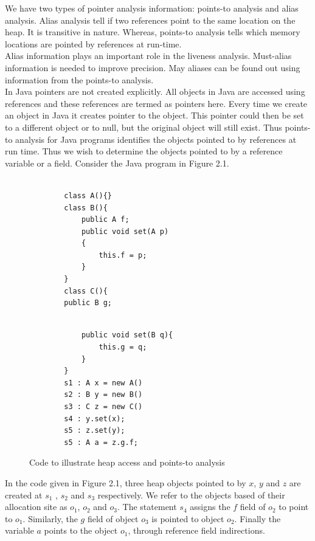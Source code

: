We have two types of pointer analysis information: points-to analysis and alias analysis. Alias analysis tell if two references point to the same location on the heap. It is transitive in nature. Whereas, points-to analysis tells which memory locations are pointed by references at run-time. \\

Alias information plays an important role in the liveness analysis. Must-alias information is needed to improve precision. May aliases can be found out using information from the points-to analysis. \\

In Java pointers are not created explicitly.\cite{mtpreport} All objects in Java are accessed using references and these references are termed as pointers here. Every time we create an object in Java it creates pointer to the object. This pointer could then be set to a different object or to null, but the original object will still exist. Thus points-to analysis for Java programs identifies the objects pointed to by references at run time. Thus we wish to determine
the objects pointed to by a reference variable or a field. Consider the Java program in Figure 2.1.\\

\begin{figure}
	\begin{minipage}[b]{0.45\linewidth}
		\begin{verbatim}
		
		class A(){}
		class B(){
			public A f;
			public void set(A p)
			{
				this.f = p;
			}
		}
		class C(){
		public B g;
		\end{verbatim}
	\end{minipage}
	\quad
	\begin{minipage}[b]{0.45\linewidth}
		\begin{verbatim}
		
			public void set(B q){
				this.g = q;	
			}
		}
		s1 : A x = new A()
		s2 : B y = new B()
		s3 : C z = new C()
		s4 : y.set(x);
		s5 : z.set(y);
		s5 : A a = z.g.f;
		\end{verbatim}
	\end{minipage}
	\caption{Code to illustrate heap access and points-to analysis}
\end{figure}

In the code given in Figure 2.1, three heap objects pointed to by $x$, $y$ and $z$ are created at $s_1$ , $s_2$ and $s_3$ respectively. We refer to the objects based of their allocation site as $o_1$, $o_2$ and $o_3$. The statement $s_4$ assigns the $f$ field of $o_2$ to point to $o_1$. Similarly, the $g$ field of object $o_3$ is pointed to object $o_2$. Finally the variable $a$ points to the object $o_1$, through reference field indirections.\\      

